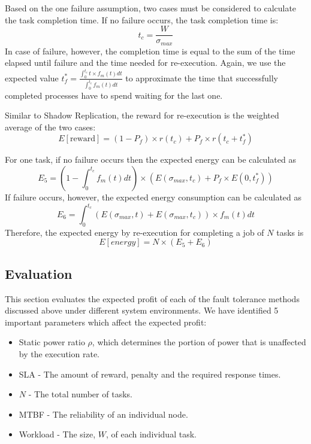 Based on the one failure assumption, two cases must be considered to
calculate the task completion time. If no failure occurs, the task
completion time is:
\begin{equation}
t_c=\frac{W}{\sigma_{max}}
\end{equation}
In case of failure, however, the completion time is equal to the sum
of the time elapsed until failure and the time needed for
re-execution. Again, we use the expected value
$t_f^*=\frac{\int_0^{t_c}t \times f_m(t)dt}{\int_0^{t_c}f_m(t)dt}$ to
approximate the time that successfully completed processes have to
spend waiting for the last one.

Similar to Shadow Replication, the reward for re-execution is the
weighted average of the two cases:
\begin{equation}
E[\text{reward}]=(1-P_f) \times r(t_c) + P_f \times r(t_c+t_f^{*})
\end{equation}

For one task, if no failure occurs then the expected energy can be
calculated as
\begin{equation}
E_5=(1 - \int_0^{t_c} f_m(t)dt) \times (E(\sigma_{max},t_c)+ P_f \times E(0,t_f^{*}))
\label{eq:energy_first_task}
\end{equation}
If failure occurs, however, the expected energy consumption can be calculated as
\begin{equation}
E_6=\int_0^{t_c}(E(\sigma_{max},t) + E(\sigma_{max},t_c)) \times f_m(t) dt
\label{eq:energy_rexecution_task}
\end{equation}
Therefore, the expected energy by re-execution for
completing a job of $N$ tasks is
\begin{equation}
E[energy]=N \times (E_5 + E_6)
\end{equation}

\subsection{Evaluation}
\noindent This section evaluates the expected profit of each of the fault tolerance
methods discussed above under different system environments. We have identified 5
important parameters which affect the expected profit:
\begin{itemize}
\item Static power ratio $\rho$, which determines the portion of power that is unaffected by the execution rate.
\item SLA - The amount of reward, penalty and the required response times.
\item $N$ - The total number of tasks.
\item MTBF - The reliability of an individual node.
\item Workload - The size, $W$, of each individual task.
\end{itemize}




